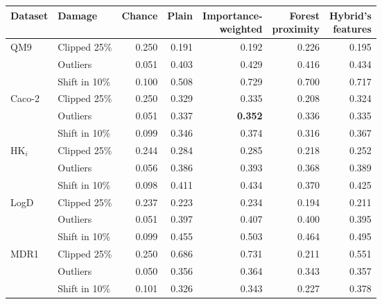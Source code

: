 \begin{table}[htbp]
\centering
\setlength{\tabcolsep}{4pt}
\begin{tabular}{@{}llrrrrr@{}}
\toprule
Dataset & Damage & Chance & Plain & \makecell[r]{Importance-\\weighted} & \makecell[r]{Forest\\proximity} & \makecell[r]{Hybrid's\\features} \\
\midrule
QM9 & Clipped 25\% & 0.250 & 0.191 & 0.192 & 0.226 & 0.195 \\
 & Outliers & 0.051 & 0.403 & 0.429 & 0.416 & 0.434 \\
 & Shift in 10\% & 0.100 & 0.508 & 0.729 & 0.700 & 0.717 \\
Caco-2 & Clipped 25\% & 0.250 & 0.329 & 0.335 & 0.208 & 0.324 \\
 & Outliers & 0.051 & 0.337 & \textbf{0.352} & 0.336 & 0.335 \\
 & Shift in 10\% & 0.099 & 0.346 & 0.374 & 0.316 & 0.367 \\
HK$_i$ & Clipped 25\% & 0.244 & 0.284 & 0.285 & 0.218 & 0.252 \\
 & Outliers & 0.056 & 0.386 & 0.393 & 0.368 & 0.389 \\
 & Shift in 10\% & 0.098 & 0.411 & 0.434 & 0.370 & 0.425 \\
LogD & Clipped 25\% & 0.237 & 0.223 & 0.234 & 0.194 & 0.211 \\
 & Outliers & 0.051 & 0.397 & 0.407 & 0.400 & 0.395 \\
 & Shift in 10\% & 0.099 & 0.455 & 0.503 & 0.464 & 0.495 \\
MDR1 & Clipped 25\% & 0.250 & 0.686 & 0.731 & 0.211 & 0.551 \\
 & Outliers & 0.050 & 0.356 & 0.364 & 0.343 & 0.357 \\
 & Shift in 10\% & 0.101 & 0.326 & 0.343 & 0.227 & 0.378 \\

\end{tabular}
\end{table}
